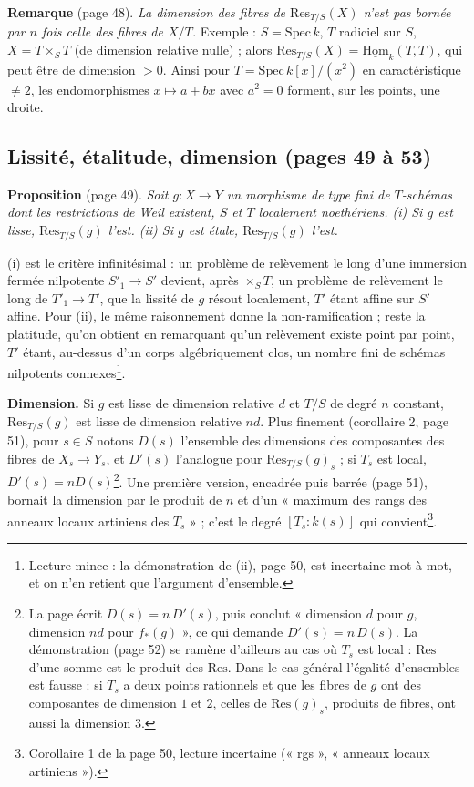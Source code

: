 \documentclass[11pt,a4paper]{article}
\begin{document}
\textbf{Remarque} (page 48). \emph{La dimension des fibres de
$\mathrm{Res}_{T/S}(X)$ n'est pas bornée par $n$ fois celle des fibres de $X/T$.}
Exemple : $S = \mathrm{Spec}\,k$, $T$ radiciel sur $S$, $X = T \times_S T$ (de
dimension relative nulle) ; alors $\mathrm{Res}_{T/S}(X) = \underline{\mathrm{Hom}}_k(T,
T)$, qui peut être de dimension $> 0$. Ainsi pour $T = \mathrm{Spec}\,k[x]/(x^2)$
en caractéristique $\neq 2$, les endomorphismes $x \mapsto a + bx$ avec $a^2 =
0$ forment, sur les points, une droite.

\subsection*{Lissité, étalitude, dimension (pages 49 à 53)}

\textbf{Proposition} (page 49). \emph{Soit $g : X \to Y$ un morphisme de type
fini de $T$-schémas dont les restrictions de Weil existent, $S$ et $T$
localement noethériens. (i) Si $g$ est lisse, $\mathrm{Res}_{T/S}(g)$ l'est.
(ii) Si $g$ est étale, $\mathrm{Res}_{T/S}(g)$ l'est.}

(i) est le critère infinitésimal : un problème de relèvement le long d'une
immersion fermée nilpotente $S'_1 \to S'$ devient, après $\times_S T$, un
problème de relèvement le long de $T'_1 \to T'$, que la lissité de $g$ résout
localement, $T'$ étant affine sur $S'$ affine. Pour (ii), le même raisonnement
donne la non-ramification ; reste la platitude, qu'on obtient en remarquant
qu'un relèvement existe point par point, $T'$ étant, au-dessus d'un corps
algébriquement clos, un nombre fini de schémas nilpotents
connexes\footnote{Lecture mince : la démonstration de (ii), page 50, est
incertaine mot à mot, et on n'en retient que l'argument d'ensemble.}.

\textbf{Dimension.} Si $g$ est lisse de dimension relative $d$ et $T/S$ de
degré $n$ constant, $\mathrm{Res}_{T/S}(g)$ est lisse de dimension relative $nd$.
Plus finement (corollaire 2, page 51), pour $s \in S$ notons $D(s)$
l'ensemble des dimensions des composantes des fibres de $X_s \to Y_s$, et
$D'(s)$ l'analogue pour $\mathrm{Res}_{T/S}(g)_s$ ; si $T_s$ est local, $D'(s) =
n D(s)$\footnote{La page écrit $D(s) = n\,D'(s)$, puis conclut « dimension $d$
pour $g$, dimension $nd$ pour $f_{*}(g)$ », ce qui demande $D'(s) = n\,D(s)$.
La démonstration (page 52) se ramène d'ailleurs au cas où $T_s$ est local :
$\mathrm{Res}$ d'une somme est le produit des $\mathrm{Res}$. Dans le cas général
l'égalité d'ensembles est fausse : si $T_s$ a deux points rationnels et que
les fibres de $g$ ont des composantes de dimension $1$ et $2$, celles de
$\mathrm{Res}(g)_s$, produits de fibres, ont aussi la dimension $3$.}. Une
première version, encadrée puis barrée (page 51), bornait la dimension par le
produit de $n$ et d'un « maximum des rangs des anneaux locaux artiniens des
$T_s$ » ; c'est le degré $[T_s : k(s)]$ qui convient\footnote{Corollaire 1 de
la page 50, lecture incertaine (« rgs », « anneaux locaux artiniens »).}.
\end{document}
